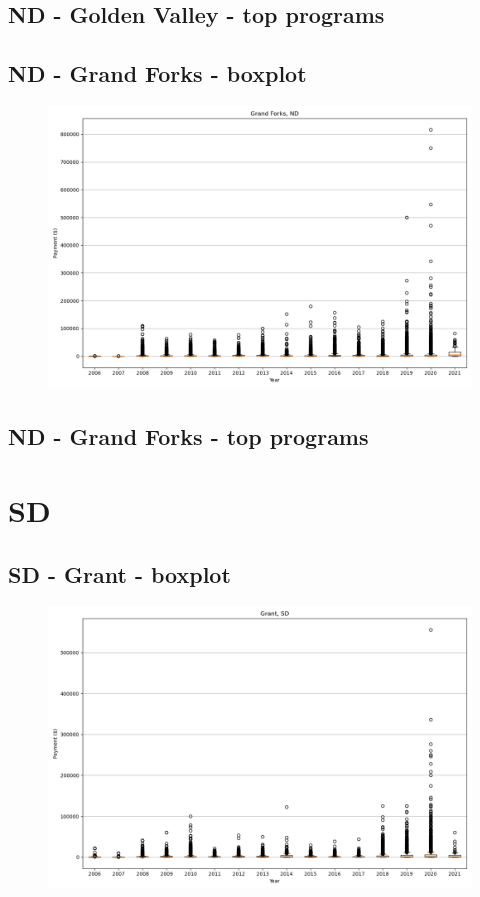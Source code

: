 \subsection*{ND - Golden Valley - top programs}

\newpage
\subsection*{ND - Grand Forks - boxplot}
\begin{figure}[h]
\centering
\includegraphics[width=7in]{../output/boxplots/counties/Grand Forks-ND_boxplot.png}
\end{figure}


\subsection*{ND - Grand Forks - top programs}

\newpage
\section*{SD}
\subsection*{SD - Grant - boxplot}
\begin{figure}[h]
\centering
\includegraphics[width=7in]{../output/boxplots/counties/Grant-SD_boxplot.png}
\end{figure}


